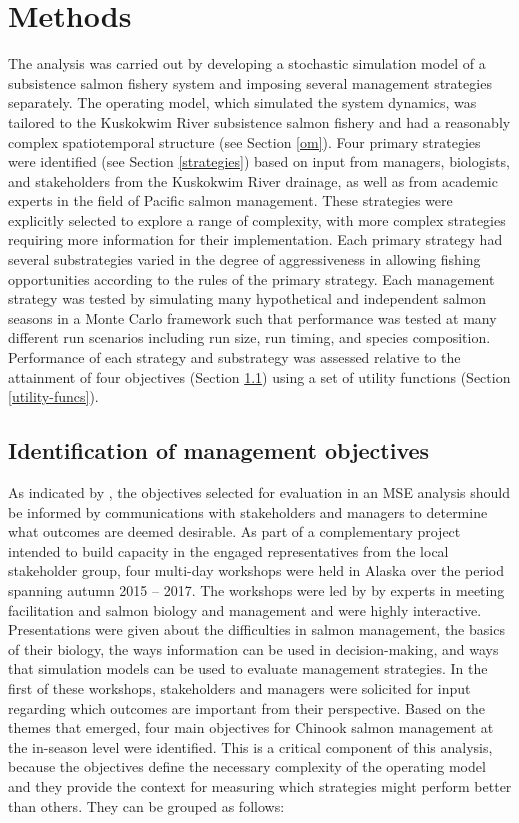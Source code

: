 \documentclass[12pt,]{book}
\theoremstyle{definition}
\theoremstyle{definition}
\theoremstyle{definition}
\theoremstyle{remark}
\begin{document}
\section{Methods}\label{methods-1}

\noindent
The analysis was carried out by developing a stochastic simulation model
of a subsistence salmon fishery system and imposing several management
strategies separately. The operating model, which simulated the system
dynamics, was tailored to the Kuskokwim River subsistence salmon fishery
and had a reasonably complex spatiotemporal structure (see Section
\ref{om}). Four primary strategies were identified (see Section
\ref{strategies}) based on input from managers, biologists, and
stakeholders from the Kuskokwim River drainage, as well as from academic
experts in the field of Pacific salmon management. These strategies were
explicitly selected to explore a range of complexity, with more complex
strategies requiring more information for their implementation. Each
primary strategy had several substrategies varied in the degree of
aggressiveness in allowing fishing opportunities according to the rules
of the primary strategy. Each management strategy was tested by
simulating many hypothetical and independent salmon seasons in a Monte
Carlo framework such that performance was tested at many different run
scenarios including run size, run timing, and species composition.
Performance of each strategy and substrategy was assessed relative to
the attainment of four objectives (Section \ref{objectives}) using a set
of utility functions (Section \ref{utility-funcs}).

\subsection{Identification of management objectives}\label{objectives}

\noindent
As indicated by \citet{punt-etal-2014}, the objectives selected for
evaluation in an MSE analysis should be informed by communications with
stakeholders and managers to determine what outcomes are deemed
desirable. As part of a complementary project intended to build capacity
in the engaged representatives from the local stakeholder group, four
multi-day workshops were held in Alaska over the period spanning autumn
2015 -- 2017. The workshops were led by by experts in meeting
facilitation and salmon biology and management and were highly
interactive. Presentations were given about the difficulties in salmon
management, the basics of their biology, the ways information can be
used in decision-making, and ways that simulation models can be used to
evaluate management strategies. In the first of these workshops,
stakeholders and managers were solicited for input regarding which
outcomes are important from their perspective. Based on the themes that
emerged, four main objectives for Chinook salmon management at the
in-season level were identified. This is a critical component of this
analysis, because the objectives define the necessary complexity of the
operating model and they provide the context for measuring which
strategies might perform better than others. They can be grouped as
follows:
\end{document}
